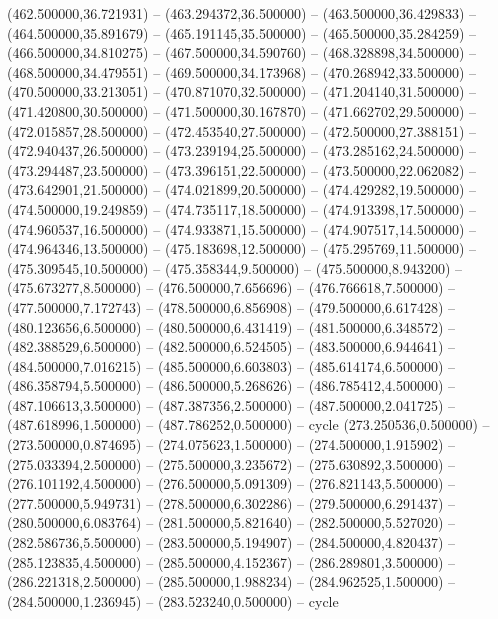(462.500000,36.721931) -- (463.294372,36.500000) -- (463.500000,36.429833) -- (464.500000,35.891679) -- (465.191145,35.500000) -- (465.500000,35.284259) -- (466.500000,34.810275) -- (467.500000,34.590760) -- (468.328898,34.500000) -- (468.500000,34.479551) -- (469.500000,34.173968) -- (470.268942,33.500000) -- (470.500000,33.213051) -- (470.871070,32.500000) -- (471.204140,31.500000) -- (471.420800,30.500000) -- (471.500000,30.167870) -- (471.662702,29.500000) -- (472.015857,28.500000) -- (472.453540,27.500000) -- (472.500000,27.388151) -- (472.940437,26.500000) -- (473.239194,25.500000) -- (473.285162,24.500000) -- (473.294487,23.500000) -- (473.396151,22.500000) -- (473.500000,22.062082) -- (473.642901,21.500000) -- (474.021899,20.500000) -- (474.429282,19.500000) -- (474.500000,19.249859) -- (474.735117,18.500000) -- (474.913398,17.500000) -- (474.960537,16.500000) -- (474.933871,15.500000) -- (474.907517,14.500000) -- (474.964346,13.500000) -- (475.183698,12.500000) -- (475.295769,11.500000) -- (475.309545,10.500000) -- (475.358344,9.500000) -- (475.500000,8.943200) -- (475.673277,8.500000) -- (476.500000,7.656696) -- (476.766618,7.500000) -- (477.500000,7.172743) -- (478.500000,6.856908) -- (479.500000,6.617428) -- (480.123656,6.500000) -- (480.500000,6.431419) -- (481.500000,6.348572) -- (482.388529,6.500000) -- (482.500000,6.524505) -- (483.500000,6.944641) -- (484.500000,7.016215) -- (485.500000,6.603803) -- (485.614174,6.500000) -- (486.358794,5.500000) -- (486.500000,5.268626) -- (486.785412,4.500000) -- (487.106613,3.500000) -- (487.387356,2.500000) -- (487.500000,2.041725) -- (487.618996,1.500000) -- (487.786252,0.500000) -- cycle
   (273.250536,0.500000) -- (273.500000,0.874695) -- (274.075623,1.500000) -- (274.500000,1.915902) -- (275.033394,2.500000) -- (275.500000,3.235672) -- (275.630892,3.500000) -- (276.101192,4.500000) -- (276.500000,5.091309) -- (276.821143,5.500000) -- (277.500000,5.949731) -- (278.500000,6.302286) -- (279.500000,6.291437) -- (280.500000,6.083764) -- (281.500000,5.821640) -- (282.500000,5.527020) -- (282.586736,5.500000) -- (283.500000,5.194907) -- (284.500000,4.820437) -- (285.123835,4.500000) -- (285.500000,4.152367) -- (286.289801,3.500000) -- (286.221318,2.500000) -- (285.500000,1.988234) -- (284.962525,1.500000) -- (284.500000,1.236945) -- (283.523240,0.500000) -- cycle
